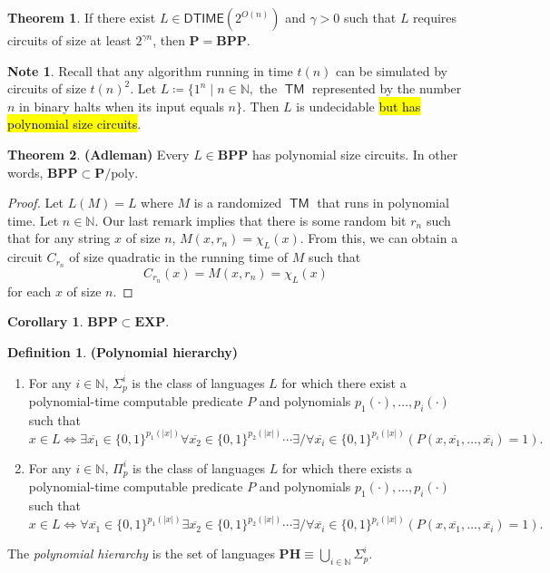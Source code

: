 \documentclass[10pt,letterpaper,cm]{nupset}
\theoremstyle{definition}
\newtheorem*{definition}{Definition}
\newtheorem{note}{Note}
\newtheorem{theorem}{Theorem}
\newtheorem{corollary}{Corollary}
\newcommand{\N}{\mathbb N}
\newcommand{\1}{\mathbf{1}}
\newcommand{\0}{\vec 0}
\DeclareMathOperator{\TM}{\mathsf{TM}}
\begin{document}
\begin{theorem}
If there exist $L \in \mathsf{DTIME}(2^{O(n)})$ and $\gamma >0$ such that $L$ requires circuits of size at least $2^{\gamma{n}}$, then $\mathbf{P} = \mathbf{BPP}$.
\end{theorem}

\begin{note}
Recall that any algorithm running in time $t(n)$ can be simulated by circuits of size $t(n)^2$. Let $L \coloneqq \{ 1^n \mid n \in \N,$ the $\TM$ represented by the number $n$ in binary halts when its input equals $n\}$. Then $L$ is undecidable \hl{but has polynomial size circuits}. 
\end{note}

\begin{theorem}{\textbf{(Adleman)}}
Every $L\in \mathbf{BPP}$ has polynomial size circuits. In other words, $\mathbf{BPP} \subset \mathbf{P}/\mathrm{poly}$.
\end{theorem}
\begin{proof}
Let $L(M)  = L$ where $M$ is a randomized $\TM$ that runs in polynomial time. Let $n\in \N$. Our last remark implies that there is some random bit $r_n$ such that for any string $x$ of size $n$, $M(x,r_n) = \chi_L(x)$. From this, we can obtain a circuit $C_{r_n}$ of size quadratic in the running time of $M$ such that $$C_{r_n}(x) = M(x,{r_n}) = \chi_L(x)$$ for each $x$ of size $n$.
\end{proof}

\begin{corollary}
$\mathbf{BPP} \subset \mathbf{EXP}$.
\end{corollary}

\begin{definition}{\textbf{(Polynomial hierarchy)}}
\begin{enumerate}
\item For any $i \in \N$, $\Sigma_p^i$ is the class of languages $L$ for which there exist a polynomial-time computable predicate $P$ and polynomials $p_1({\cdot}), \ldots, p_i({\cdot})$ such that $$x \in L \iff \exists \overline{x_1}\in \{0,1\}^{p_1(|x|)} \forall \overline{x_2} \in  \{0,1\}^{p_2(|x|)}\cdots \exists /\forall \overline{x_i}\in \{0,1\}^{p_i(|x|)}(P(x, \overline{x_1}, \ldots, \overline{x_i}) =1).$$  
\item For any $i \in \N$, $\Pi_p^i$ is the class of languages $L$ for which there exists a polynomial-time computable predicate $P$ and polynomials $p_1({\cdot}), \ldots, p_i({\cdot})$ such that $$x \in L \iff \forall \overline{x_1}\in \{0,1\}^{p_1(|x|)} \exists \overline{x_2} \in  \{0,1\}^{p_2(|x|)}\cdots \exists /\forall \overline{x_i}\in \{0,1\}^{p_i(|x|)}(P(x, \overline{x_1}, \ldots, \overline{x_i}) =1).$$  
\end{enumerate}
The \textit{polynomial hierarchy} is the set of languages $\mathbf{PH} \equiv \bigcup_{i\in \N}\Sigma_p^i$.
\end{definition}
\end{document}

